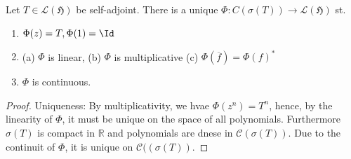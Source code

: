 \begin{theo}
Let $T\in\mathcal L(\mathfrak H)$ be self-adjoint. There is a unique $\Phi\colon C(\sigma(T))\to \mathcal L(\mathfrak H)$ st. 
\begin{enumerate}
    \item $\Phi(z) = T, \Phi(1)=\Id$
    \item (a) $\Phi$ is linear, (b) $\Phi$ is multiplicative (c) $\Phi(\overline f)= \Phi(f)^*$
    \item $\Phi$ is continuous.
\end{enumerate}
\end{theo}

\begin{proof}
Uniqueness: By multiplicativity, we hvae $\Phi(z^n) = T^n$, hence, by the linearity of $\Phi$, it must be unique on the space of all polynomials. Furthermore $\sigma(T)$ is compact in $\mathbb R$ and polynomials are dnese in $\mathcal C(\sigma(T))$. Due to the continuit of $\Phi$, it is unique on $\mathcal C((\sigma(T))$. 
\end{proof}